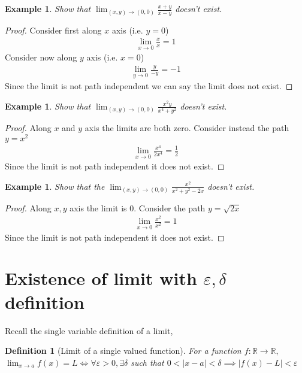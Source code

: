 \documentclass[oneside,11pt,pdftex]{book}%
\numberwithin{equation}{section}
\newtheorem{example}[theorem]{Example}
\newtheorem{definition}[theorem]{Definition}
\numberwithin{section}{chapter}
\numberwithin{equation}{chapter}
\newcommand{\R}{\mathbb{R}}
\begin{document}
\begin{example}
	Show that $ \lim_{(x,y)\rightarrow (0,0)} \frac{x+y}{x-y}$ doesn't exist.
\end{example}
\begin{proof}
	Consider first along $x$ axis (i.e. $y=0$)
	\begin{align*}
		\lim_{x\rightarrow 0} \frac{x}{x}=1
	\end{align*}
	Consider now along $y$ axis (i.e. $x=0$)
	\begin{align*}
		\lim_{y \rightarrow 0} \frac{y}{-y}=-1
	\end{align*}
	Since the limit is not path independent we can say the limit does not exist.
\end{proof}

\begin{example}
	Show that $ \lim_{(x,y) \rightarrow (0,0)} \frac{x^2y}{x^4+y^2}$ doesn't exist.
\end{example}
\begin{proof}
	Along $ x  $ and $ y $ axis the limits are both zero.
	Consider instead the path $ y=x^2 $
	\begin{align*}
		\lim_{x\rightarrow 0} \frac{x^4}{2x^4}=\frac{1}{2}
	\end{align*}
	Since the limit is not path independent it does not exist.
\end{proof}

\begin{example}
	Show that the $ \lim_{(x,y)\rightarrow (0,0)} \frac{x^2}{x^2+y^2-2x}$ doesn't exist.
\end{example}

\begin{proof}
	Along $ x, y $ axis the limit is 0.	Consider the path $ y=\sqrt{2x}$
	\begin{align*}
		\lim_{x\rightarrow 0} \frac{x^2}{x^2}=1
	\end{align*}
	Since the limit is not path independent it does not exist.
\end{proof}

\section{Existence of limit with $\varepsilon, \delta$ definition}
Recall the single variable definition of a limit,
\begin{definition}[Limit of a single valued function]
	For a function $ f:\R \rightarrow \R,$ $\lim_{x \rightarrow a}f(x)=L \iff \forall \varepsilon >0, \exists \delta $ such that $ 0<|x-a|<\delta \implies |f(x)-L|<\varepsilon $
\end{definition}
\end{document}
